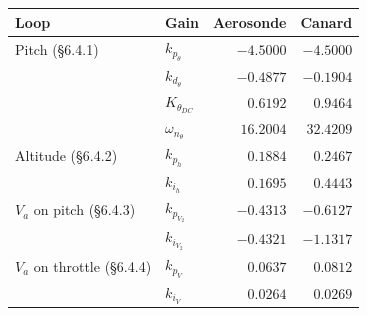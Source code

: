 \begin{tabular}{llrr}
\toprule
Loop & Gain & Aerosonde & Canard \\
\midrule
Pitch (\S6.4.1) & $k_{p_\theta}$ & $-4.5000$ & $-4.5000$ \\
 & $k_{d_\theta}$ & $-0.4877$ & $-0.1904$ \\
 & $K_{\theta_{DC}}$ & $0.6192$ & $0.9464$ \\
 & $\omega_{n_\theta}$ & $16.2004$ & $32.4209$ \\
Altitude (\S6.4.2) & $k_{p_h}$ & $0.1884$ & $0.2467$ \\
 & $k_{i_h}$ & $0.1695$ & $0.4443$ \\
$V_a$ on pitch (\S6.4.3) & $k_{p_{V_2}}$ & $-0.4313$ & $-0.6127$ \\
 & $k_{i_{V_2}}$ & $-0.4321$ & $-1.1317$ \\
$V_a$ on throttle (\S6.4.4) & $k_{p_V}$ & $0.0637$ & $0.0812$ \\
 & $k_{i_V}$ & $0.0264$ & $0.0269$ \\
\bottomrule
\end{tabular}
